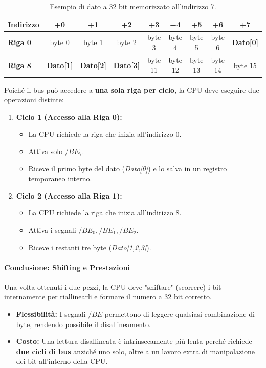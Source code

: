 \documentclass[a4paper,12pt]{article}
\begin{document}
	\begin{table}[h!]
		\centering
		\begin{tabular}{@{}l|c|c|c|c|c|c|c|c|@{}}
			\toprule
			\textbf{Indirizzo} & \textbf{+0} & \textbf{+1} & \textbf{+2} & \textbf{+3} & \textbf{+4} & \textbf{+5} & \textbf{+6} & \textbf{+7} \\ \midrule
			\textbf{Riga 0}    & byte 0      & byte 1      & byte 2      & byte 3      & byte 4      & byte 5      & byte 6      & \cellcolor{blue!20}\textbf{Dato[0]} \\ \midrule
			\textbf{Riga 8}    & \cellcolor{blue!20}\textbf{Dato[1]} & \cellcolor{blue!20}\textbf{Dato[2]} & \cellcolor{blue!20}\textbf{Dato[3]} & byte 11     & byte 12     & byte 13     & byte 14     & byte 15     \\ \bottomrule
		\end{tabular}
		\caption{Esempio di dato a 32 bit memorizzato all'indirizzo 7.}
	\end{table}
	
	Poiché il bus può accedere a \textbf{una sola riga per ciclo}, la CPU deve eseguire due operazioni distinte:
	
	\begin{enumerate}
		\item \textbf{Ciclo 1 (Accesso alla Riga 0):}
		\begin{itemize}
			\item La CPU richiede la riga che inizia all'indirizzo 0.
			\item Attiva solo \textbf{$/BE_7$}.
			\item Riceve il primo byte del dato (\textit{Dato[0]}) e lo salva in un registro temporaneo interno.
		\end{itemize}
		
		\item \textbf{Ciclo 2 (Accesso alla Riga 1):}
		\begin{itemize}
			\item La CPU richiede la riga che inizia all'indirizzo 8.
			\item Attiva i segnali \textbf{$/BE_0, /BE_1, /BE_2$}.
			\item Riceve i restanti tre byte (\textit{Dato[1,2,3]}).
		\end{itemize}
	\end{enumerate}
	
	\paragraph{Conclusione: Shifting e Prestazioni}
	Una volta ottenuti i due pezzi, la CPU deve "shiftare" (scorrere) i bit internamente per riallinearli e formare il numero a 32 bit corretto. 
	\begin{itemize}
		\item \textbf{Flessibilità:} I segnali $/BE$ permettono di leggere qualsiasi combinazione di byte, rendendo possibile il disallineamento.
		\item \textbf{Costo:} Una lettura disallineata è intrinsecamente più lenta perché richiede \textbf{due cicli di bus} anziché uno solo, oltre a un lavoro extra di manipolazione dei bit all'interno della CPU.
	\end{itemize}
	
\end{document}

